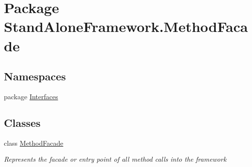 \hypertarget{namespace_stand_alone_framework_1_1_method_facade}{\section{Package Stand\+Alone\+Framework.\+Method\+Facade}
\label{namespace_stand_alone_framework_1_1_method_facade}
}
\subsection*{Namespaces}
\begin{DoxyCompactItemize}
\item 
package \hyperlink{namespace_stand_alone_framework_1_1_method_facade_1_1_interfaces}{Interfaces}
\end{DoxyCompactItemize}
\subsection*{Classes}
\begin{DoxyCompactItemize}
\item 
class \hyperlink{class_stand_alone_framework_1_1_method_facade_1_1_method_facade}{Method\+Facade}
\begin{DoxyCompactList}\small\item\em Represents the facade or entry point of all method calls into the framework \end{DoxyCompactList}\end{DoxyCompactItemize}
